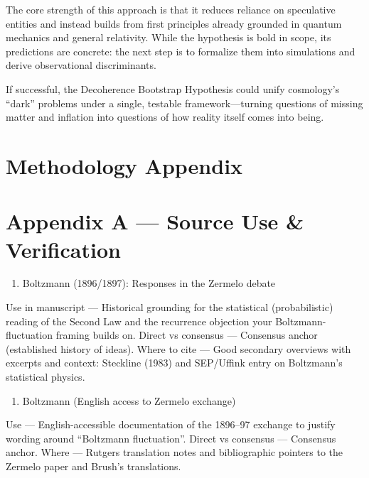 \documentclass[
]{article}
\providecommand{\tightlist}{%
  \setlength{\itemsep}{0pt}\setlength{\parskip}{0pt}}
\begin{document}
The core strength of this approach is that it reduces reliance on
speculative entities and instead builds from first principles already
grounded in quantum mechanics and general relativity. While the
hypothesis is bold in scope, its predictions are concrete: the next step
is to formalize them into simulations and derive observational
discriminants.

If successful, the Decoherence Bootstrap Hypothesis could unify
cosmology's ``dark'' problems under a single, testable
framework---turning questions of missing matter and inflation into
questions of how reality itself comes into being.

\clearpage

\section{Methodology Appendix}\label{methodology-appendix}

\section{Appendix A --- Source Use \&
Verification}\label{appendix-a-source-use-verification}

\begin{enumerate}
\def\labelenumi{\arabic{enumi})}
\tightlist
\item
  Boltzmann (1896/1897): Responses in the Zermelo debate
\end{enumerate}

Use in manuscript --- Historical grounding for the statistical
(probabilistic) reading of the Second Law and the recurrence objection
your Boltzmann-fluctuation framing builds on. Direct vs consensus ---
Consensus anchor (established history of ideas). Where to cite --- Good
secondary overviews with excerpts and context: Steckline (1983) and
SEP/Uffink entry on Boltzmann's statistical physics.

\begin{enumerate}
\def\labelenumi{\arabic{enumi})}
\setcounter{enumi}{1}
\tightlist
\item
  Boltzmann (English access to Zermelo exchange)
\end{enumerate}

Use --- English-accessible documentation of the 1896--97 exchange to
justify wording around ``Boltzmann fluctuation''. Direct vs consensus
--- Consensus anchor. Where --- Rutgers translation notes and
bibliographic pointers to the Zermelo paper and Brush's translations.
\end{document}

